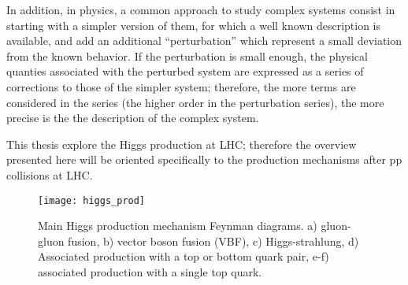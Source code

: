 \noindent In addition, in physics, a common approach to study complex systems consist in starting with a simpler version of them, for which a well known description is available, and add an additional ``perturbation'' which represent a small deviation from the known behavior. If the perturbation is small enough, the physical quanties associated with the perturbed system are expressed as a series of corrections to those of the simpler system; therefore, the more terms are considered in the series (the higher order in the perturbation series), the more precise is the the description of the complex system.

\noindent This thesis explore the Higgs production at LHC; therefore the overview presented here will be oriented specifically to the production mechanisms after pp collisions at LHC.

\begin{figure}[!h]
\centering
\texttt{[image: higgs\_prod]}
\caption[Higgs production mechanism Feynman diagrams]{Main Higgs production mechanism Feynman diagrams. a) gluon-gluon fusion, b) vector boson fusion (VBF), c) Higgs-strahlung, d) Associated production with a top or bottom quark pair, e-f) associated production with a single top quark.}
\label{higgs_prod}
\end{figure}

